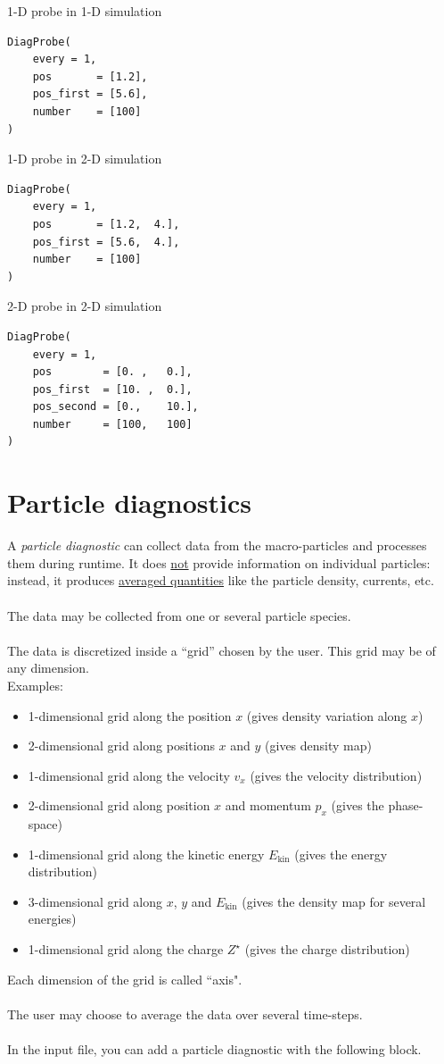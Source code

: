 \documentclass[11pt]{article}
\begin{document}
1-D probe in 1-D simulation
\begin{lstlisting}
DiagProbe(
    every = 1,
    pos       = [1.2],
    pos_first = [5.6],
    number    = [100]
)
\end{lstlisting}

1-D probe in 2-D simulation
\begin{lstlisting}
DiagProbe(
    every = 1,
    pos       = [1.2,  4.],
    pos_first = [5.6,  4.],
    number    = [100]
)
\end{lstlisting}

2-D probe in 2-D simulation
\begin{lstlisting}
DiagProbe(
    every = 1,
    pos        = [0. ,   0.],
    pos_first  = [10. ,  0.],
    pos_second = [0.,    10.],
    number     = [100,   100]
)
\end{lstlisting}

\clearpage



\section{Particle diagnostics}

A \textit{particle diagnostic} can collect data from the macro-particles and processes them during runtime.
It does \underline{not} provide information on individual particles: instead, it produces \underline{averaged quantities}
like the particle density, currents, etc.\\
\\
The data may be collected from one or several particle species.\\
\\
The data is discretized inside a ``grid'' chosen by the user. This grid may be of any dimension.\\
Examples:
\begin{itemize}
\item 1-dimensional grid along the position $x$ (gives density variation along $x$)
\item 2-dimensional grid along positions $x$ and $y$ (gives density map)
\item 1-dimensional grid along the velocity $v_x$ (gives the velocity distribution)
\item 2-dimensional grid along position $x$ and momentum $p_x$ (gives the phase-space)
\item 1-dimensional grid along the kinetic energy $E_\mathrm{kin}$ (gives the energy distribution)
\item 3-dimensional grid along $x$, $y$ and $E_\mathrm{kin}$ (gives the density map for several energies)
\item 1-dimensional grid along the charge $Z^\star$ (gives the charge distribution)
\end{itemize}
Each dimension of the grid is called ``axis".\\
\\
The user may choose to average the data over several time-steps.\\
\\
In the input file, you can add a particle diagnostic with the following block.
\end{document}
